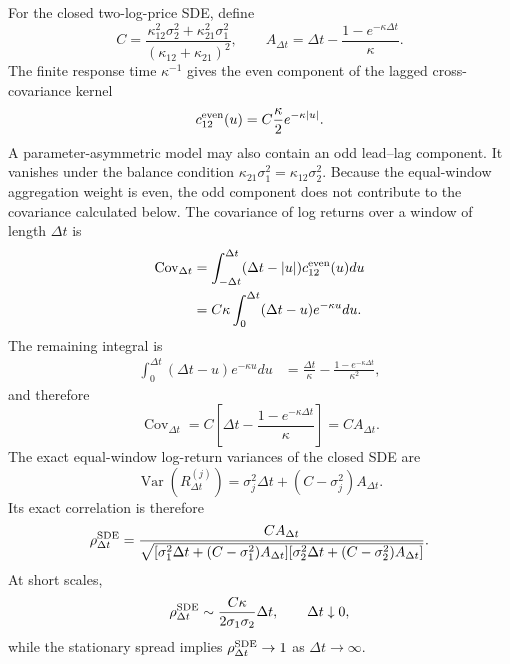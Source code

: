 \documentclass[5p,final]{elsarticle}
\begin{document}
For the closed two-log-price SDE, define
\begin{equation}
    C
    =\frac{\kappa_{12}^2\sigma_2^2+\kappa_{21}^2\sigma_1^2}
    {(\kappa_{12}+\kappa_{21})^2},
    \qquad
    A_{\Delta t}
    =\Delta t-\frac{1-e^{-\kappa\Delta t}}{\kappa}.
\end{equation}
The finite response time $\kappa^{-1}$ gives the even component of the lagged cross-covariance kernel
\begin{equation}
    c_{12}^{\rm even}(u)=C\frac{\kappa}{2}e^{-\kappa|u|}.
\end{equation}
A parameter-asymmetric model may also contain an odd lead--lag component. It vanishes under the balance condition $\kappa_{21}\sigma_1^2=\kappa_{12}\sigma_2^2$. Because the equal-window aggregation weight is even, the odd component does not contribute to the covariance calculated below.
The covariance of log returns over a window of length $\Delta t$ is
\begin{align}
    \operatorname{Cov}_{\Delta t}
    &=\int_{-\Delta t}^{\Delta t}
    (\Delta t-|u|)c_{12}^{\rm even}(u)du\\
    &=C\kappa\int_0^{\Delta t}
    (\Delta t-u)e^{-\kappa u}du.
\end{align}
The remaining integral is
\begin{align}
    \int_0^{\Delta t}(\Delta t-u)e^{-\kappa u}du
    &=\frac{\Delta t}{\kappa}
    -\frac{1-e^{-\kappa\Delta t}}{\kappa^2},
\end{align}
and therefore
\begin{equation}
    \operatorname{Cov}_{\Delta t}
    =C\left[\Delta t-
    \frac{1-e^{-\kappa\Delta t}}{\kappa}\right]
    =CA_{\Delta t}.
\end{equation}
The exact equal-window log-return variances of the closed SDE are
\begin{equation}
    \operatorname{Var}(R_{\Delta t}^{(j)})
    =\sigma_j^2\Delta t+(C-\sigma_j^2)A_{\Delta t}.
\end{equation}
Its exact correlation is therefore
\begin{equation*}
    \rho_{\Delta t}^{\rm SDE}
    =\frac{CA_{\Delta t}}
    {\sqrt{[\sigma_1^2\Delta t+(C-\sigma_1^2)A_{\Delta t}]
    [\sigma_2^2\Delta t+(C-\sigma_2^2)A_{\Delta t}]}}.
\end{equation*}
At short scales,
\begin{equation}
    \rho_{\Delta t}^{\rm SDE}
    \sim\frac{C\kappa}{2\sigma_1\sigma_2}\Delta t,
    \qquad \Delta t\downarrow0,
\end{equation}
while the stationary spread implies $\rho_{\Delta t}^{\rm SDE}\to1$ as $\Delta t\to\infty$.
\end{document}
